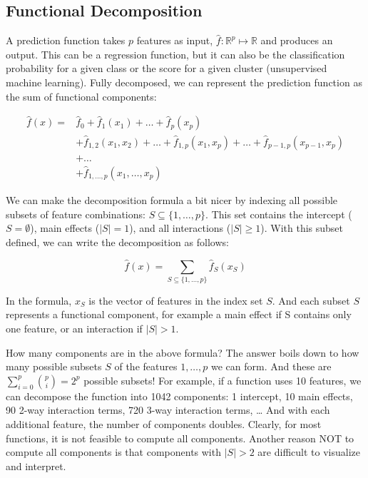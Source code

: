 \documentclass[
  10pt,
]{scrbook}
\begin{document}
\hypertarget{functional-decomposition}{%
\subsection{Functional Decomposition}\label{functional-decomposition}}

A prediction function takes \(p\) features as input, \(\hat{f}: \mathbb{R}^p \mapsto \mathbb{R}\) and produces an output.
This can be a regression function, but it can also be the classification probability for a given class or the score for a given cluster (unsupervised machine learning).
Fully decomposed, we can represent the prediction function as the sum of functional components:

\begin{align*}
\hat{f}(x) = & \hat{f}_0 + \hat{f}_1(x_1) + \ldots + \hat{f}_p(x_p) \\
& + \hat{f}_{1,2}(x_1, x_2) + \ldots + \hat{f}_{1,p}(x_1, x_p) + \ldots + \hat{f}_{p-1,p}(x_{p-1}, x_p) \\ 
& + \ldots  \\ & +  \hat{f}_{1,\ldots,p}(x_1, \ldots, x_p)
\end{align*}

We can make the decomposition formula a bit nicer by indexing all possible subsets of feature combinations: \(S\subseteq\{1,\ldots,p\}\).
This set contains the intercept (\(S=\emptyset\)), main effects (\(|S|=1\)), and all interactions (\(|S|\geq{}1\)).
With this subset defined, we can write the decomposition as follows:

\[\hat{f}(x) = \sum_{S\subseteq\{1,\ldots,p\}} \hat{f}_S(x_S)\]

In the formula, \(x_S\) is the vector of features in the index set \(S\).
And each subset \(S\) represents a functional component, for example a main effect if S contains only one feature, or an interaction if \(|S| > 1\).

How many components are in the above formula?
The answer boils down to how many possible subsets \(S\) of the features \(1,\ldots, p\) we can form.
And these are \(\sum_{i=0}^p\binom{p}{i}=2^p\) possible subsets!
For example, if a function uses 10 features, we can decompose the function into 1042 components: 1 intercept, 10 main effects, 90 2-way interaction terms, 720 3-way interaction terms, \ldots{}
And with each additional feature, the number of components doubles.
Clearly, for most functions, it is not feasible to compute all components.
Another reason NOT to compute all components is that components with \(|S|>2\) are difficult to visualize and interpret.
\end{document}
